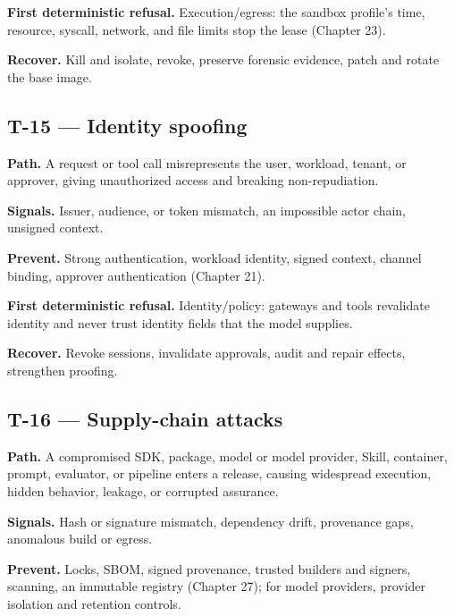 \textbf{First deterministic refusal.} Execution/egress: the sandbox profile's time, resource, syscall, network, and file limits stop the lease (Chapter 23).\par

\textbf{Recover.} Kill and isolate, revoke, preserve forensic evidence, patch and rotate the base image.\par

\subsection{T-15 — Identity spoofing}

\textbf{Path.} A request or tool call misrepresents the user, workload, tenant, or approver, giving unauthorized access and breaking non-repudiation.\par

\textbf{Signals.} Issuer, audience, or token mismatch, an impossible actor chain, unsigned context.\par

\textbf{Prevent.} Strong authentication, workload identity, signed context, channel binding, approver authentication (Chapter 21).\par

\textbf{First deterministic refusal.} Identity/policy: gateways and tools revalidate identity and never trust identity fields that the model supplies.\par

\textbf{Recover.} Revoke sessions, invalidate approvals, audit and repair effects, strengthen proofing.\par

\subsection{T-16 — Supply-chain attacks}

\textbf{Path.} A compromised SDK, package, model or model provider, Skill, container, prompt, evaluator, or pipeline enters a release, causing widespread execution, hidden behavior, leakage, or corrupted assurance.\par

\textbf{Signals.} Hash or signature mismatch, dependency drift, provenance gaps, anomalous build or egress.\par

\textbf{Prevent.} Locks, SBOM, signed provenance, trusted builders and signers, scanning, an immutable registry (Chapter 27); for model providers, provider isolation and retention controls.\par

